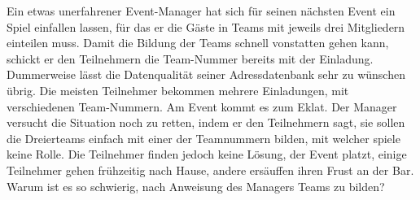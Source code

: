 Ein etwas unerfahrener Event-Manager hat sich für seinen nächsten
Event ein Spiel einfallen lassen, für das er die Gäste in
Teams mit jeweils drei Mitgliedern einteilen muss. 
Damit die Bildung der Teams schnell vonstatten gehen kann, schickt
er den Teilnehmern die Team-Nummer bereits mit der Einladung.
Dummerweise lässt die Datenqualität seiner Adressdatenbank
sehr zu wünschen übrig. Die meisten Teilnehmer bekommen mehrere
Einladungen, mit verschiedenen Team-Nummern. Am Event kommt es zum Eklat.
Der Manager versucht die Situation noch zu retten, indem er den
Teilnehmern sagt, sie sollen die Dreierteams einfach mit einer
der Teamnummern bilden, mit welcher spiele keine Rolle. Die Teilnehmer
finden jedoch keine Lösung, der Event platzt, einige Teilnehmer 
gehen frühzeitig nach Hause, andere ersäuffen ihren Frust an der Bar.
Warum ist es so schwierig, nach Anweisung des Managers Teams zu bilden?


